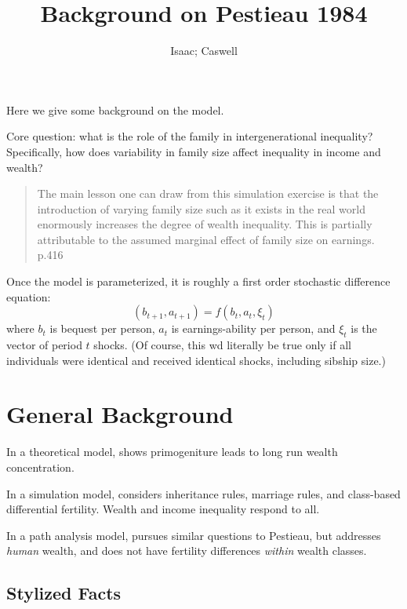 \documentclass{article}
\begin{document}
\author{Isaac; Caswell}
\title{Background on Pestieau 1984}
\maketitle

Here we give some background on the \citet{pestieau-1984-oep} model.

Core question: what is the role of the family in intergenerational inequality?
Specifically, how does variability in family size affect inequality in income and wealth?

\begin{quote}
The main lesson one can draw from this simulation exercise
is that the introduction of varying family size such as it exists in the real world
enormously increases the degree of wealth inequality.
This is partially attributable to the assumed marginal effect of family size on earnings.
\\
p.416
\end{quote}

Once the model is parameterized,
it is roughly a first order stochastic difference equation:
\begin{equation}
(b_{t+1}, a_{t+1}) = f(b_{t}, a_{t}, \xi_{t})
\end{equation}
where
$b_{t}$ is bequest per person,
$a_{t}$ is earnings-ability per person,
and
$\xi_{t}$ is the vector of period $t$ shocks.
(Of course, this wd literally be true only if all
individuals were identical and received identical shocks,
including sibship size.)


\section{General Background}

In a theoretical model,
\citet{stiglitz-1969-e} shows primogeniture leads to long run wealth concentration.

In a simulation model,
\citet{pryor-1973-aer} considers inheritance rules, marriage rules,
and class-based differential fertility.
Wealth and income inequality respond to all.

In a path analysis model,
\citet{clague-1977-jhr} pursues similar questions to Pestieau,
but addresses \emph{human} wealth,
and does not have fertility differences \emph{within} wealth classes.


\subsection{Stylized Facts}
\end{document}
